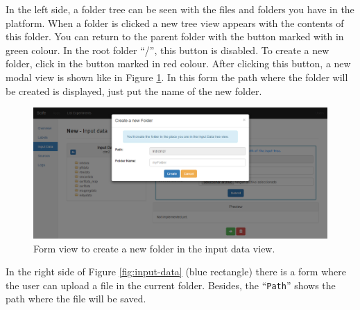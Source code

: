 \documentclass[11pt]{article}
\begin{document}
In the left side, a folder tree can be seen with the files and folders you have in the platform. When a folder is clicked a new tree view appears with the contents of this folder. You can return to the parent folder with the button marked with in green colour. In the root folder ``/'', this button is disabled. To create a new folder, click in the button marked in red colour. After clicking this button, a new modal view is shown like in Figure \ref{fig:input-create-folder}. In this form the path where the folder will be created is displayed, just put the name of the new folder.
\begin{figure}[htp]
	\centering
	\includegraphics[width=\linewidth]{img/input-create-folder}
	\caption{Form view to create a new folder in the input data view.}
	\label{fig:input-create-folder}
\end{figure}

In the right side of Figure \ref{fig:input-data} (blue rectangle) there is a form where the user can upload a file in the current folder. Besides, the ``\texttt{Path}'' shows the path where the file will be saved.
\end{document}
